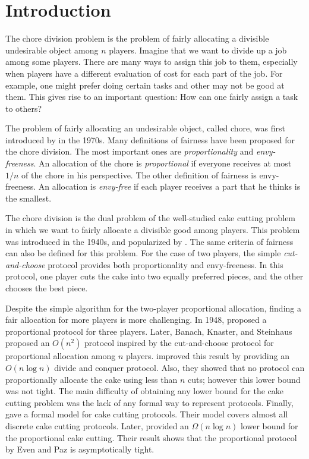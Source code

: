 \section{Introduction}

The chore division problem is the problem of fairly allocating a divisible undesirable object among $n$ players. Imagine that we want to divide up a job among some players. There are many ways to assign this job to them, especially when players have a different evaluation of cost for each part of the job. For example, one might prefer doing certain tasks and other may not be good at them. This gives rise to an important question: How can one fairly assign a task to others?

The problem of fairly allocating an undesirable object, called chore, was first introduced by  in the 1970s. Many definitions of fairness have been proposed for the chore division. The most important ones are \textit{proportionality} and \textit{envy-freeness}. An allocation of the chore is \textit{proportional} if everyone receives at most $1/n$ of the chore in his perspective. The other definition of fairness is envy-freeness. An allocation is \textit{envy-free} if each player receives a part that he thinks is the smallest. 

The chore division is the dual problem of the well-studied cake cutting problem in which we want to fairly allocate a divisible good among players. This problem was introduced in the 1940s, and popularized by . The same criteria of fairness can also be defined for this problem. For the case of two players, the simple \textit{cut-and-choose} protocol provides both proportionality and envy-freeness. In this protocol, one player cuts the cake into two equally preferred pieces, and the other chooses the best piece.

Despite the simple algorithm for the two-player proportional allocation, finding a fair allocation for more players is more challenging. In 1948,  proposed a proportional protocol for three players. Later, Banach, Knaster, and Steinhaus proposed an $O(n^2)$ protocol inspired by the cut-and-choose protocol for proportional allocation among $n$ players.  improved this result by providing an $O(n \log n)$ divide and conquer protocol. Also, they showed that no protocol can proportionally allocate the cake using less than $n$ cuts; however this lower bound was not tight. The main difficulty of obtaining any lower bound for the cake cutting problem was the lack of any formal way to represent protocols. Finally,  gave a formal model for cake cutting protocols. Their model covers almost all discrete cake cutting protocols. Later,  provided an $\Omega( n \log n)$ lower bound for the proportional cake cutting. Their result shows that the proportional protocol by Even and Paz is asymptotically tight.

